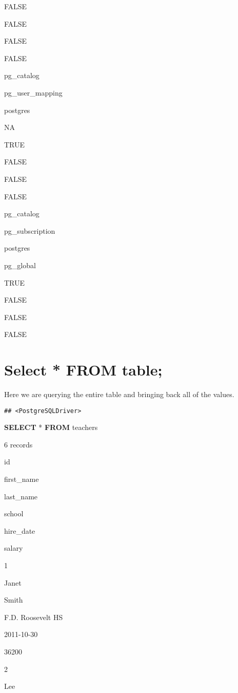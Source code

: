 \documentclass[]{book}
\newenvironment{Shaded}{\begin{snugshade}}{\end{snugshade}}
\newcommand{\KeywordTok}[1]{\textcolor[rgb]{0.13,0.29,0.53}{\textbf{#1}}}
\newcommand{\NormalTok}[1]{#1}
\begin{document}
FALSE

FALSE

FALSE

FALSE

pg\_catalog

pg\_user\_mapping

postgres

NA

TRUE

FALSE

FALSE

FALSE

pg\_catalog

pg\_subscription

postgres

pg\_global

TRUE

FALSE

FALSE

FALSE

\chapter{Select * FROM table;}\label{select-from-table}

Here we are querying the entire table and bringing back all of the
values.

\begin{verbatim}
## <PostgreSQLDriver>
\end{verbatim}

\begin{Shaded}
\begin{Highlighting}[]
\KeywordTok{SELECT}\NormalTok{ * }\KeywordTok{FROM}\NormalTok{ teachers}
\end{Highlighting}
\end{Shaded}

\label{tab:unnamed-chunk-15}6 records

id

first\_name

last\_name

school

hire\_date

salary

1

Janet

Smith

F.D. Roosevelt HS

2011-10-30

36200

2

Lee
\end{document}
